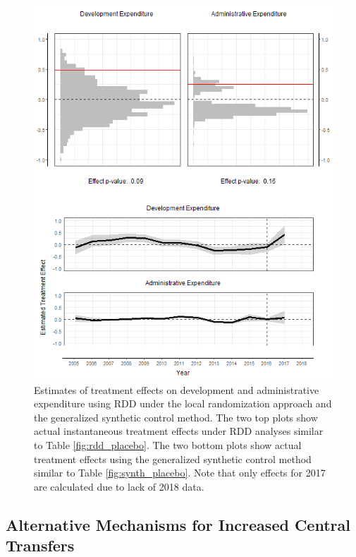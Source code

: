 \documentclass[12pt]{article}
\newcommand{\1}{\mathbbm{1}}
\begin{document}
\begin{figure}[!htbp]
	\centering
	\includegraphics[height=.75\textheight]{figure/190529_mech_results.png}
	\captionsetup{singlelinecheck=off}
	\caption[Estimated RDD and synthetic control treatment effects]{Estimates of treatment effects on development and administrative expenditure using RDD under the local randomization approach and the generalized synthetic control method. The two top plots show actual instantaneous treatment effects under RDD analyses similar to Table \ref{fig:rdd_placebo}. The two bottom plots show actual treatment effects using the generalized synthetic control method similar to Table \ref{fig:synth_placebo}. Note that only effects for 2017 are calculated due to lack of 2018 data.}
	\label{fig:synth_rdd_mech}
\end{figure}

\subsection{Alternative Mechanisms for Increased Central Transfers}
\end{document}
